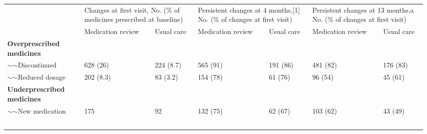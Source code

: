 
\begin{table}[]
\begin{tabular}{lllllll}
\hline
\multirow{2}{*}{}                  & \multicolumn{2}{l}{Changes at first visit, No. (\%   of medicines prescribed at baseline)} & \multicolumn{2}{l}{Persistent changes at 4   months,{[}1{]} No. (\% of changes at first visit)} & \multicolumn{2}{l}{Persistent changes at 13   months,a No. (\% of   changes at first visit)} \\ \cline{2-7} 
                                   & Medication review                               & Usual care                               & Medication review                                  & Usual care                                 & Medication review                                & Usual care                                \\ \cline{1-1}
\textbf{Overprescribed medicines}  &                                                 &                                          &                                                    &                                            &                                                  &                                           \\
$\sim$$\sim$Discontinued           & 628 (26)                                        & 224 (8.7)                                & 565 (91)                                           & 191 (86)                                   & 481 (82)                                         & 176 (83)                                  \\
$\sim$$\sim$Reduced dosage         & 202 (8.3)                                       & 83 (3.2)                                 & 154 (78)                                           & 61 (76)                                    & 96 (54)                                          & 45 (61)                                   \\
\textbf{Underprescribed medicines} &                                                 &                                          &                                                    &                                            &                                                  &                                           \\
$\sim$$\sim$New medication         & 175                                             & 92                                       & 132 (75)                                           & 62 (67)                                    & 103 (62)                                         & 43 (49)                                   \\
$$
\end{tabular}
\end{table}
